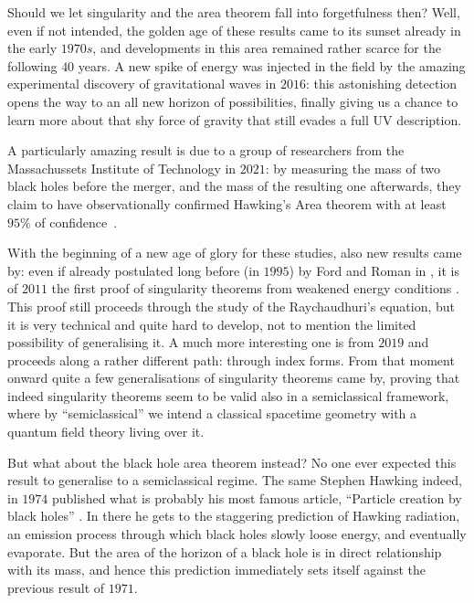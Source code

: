 Should we let singularity and the area theorem fall into forgetfulness then? Well, even if not intended, the golden age of these results came to its sunset already in the early \(1970s\), and developments in this area remained rather scarce for the following \(40\) years. A new spike of energy was injected in the field by the amazing experimental discovery of gravitational waves in \(2016\): this astonishing detection opens the way to an all new horizon of possibilities, finally giving us a chance to learn more about that shy force of gravity that still evades a full UV description.

A particularly amazing result is due to a group of researchers from the Massachussets Institute of Technology in \(2021\): by measuring the mass of two black holes before the merger, and the mass of the resulting one afterwards, they claim to have observationally confirmed Hawking's Area theorem with at least \(95\%\) of confidence~\cite[]{PhysRevLett.127.011103}.

With the beginning of a new age of glory for these studies, also new results came by: even if already postulated long before (in \(1995\)) by Ford and Roman in \cite[]{ford1996averaged}, it is of \(2011\) the first proof of singularity theorems from weakened energy conditions \cite[]{fewster2011singularity}. This proof still proceeds through the study of the Raychaudhuri's equation, but it is very technical and quite hard to develop, not to mention the limited possibility of generalising it. A much more interesting one is from \(2019\) \cite[]{fewster2020new} and proceeds along a rather different path: through index forms.
From that moment onward quite a few generalisations of singularity theorems came by, proving that indeed singularity theorems seem to be valid also in a semiclassical framework, where by ``semiclassical'' we intend a classical spacetime geometry with a quantum field theory living over it.

But what about the black hole area theorem instead? No one ever expected this result to generalise to a semiclassical regime. The same Stephen Hawking indeed, in \(1974\) published what is probably his most famous article, ``Particle creation by black holes'' \cite[]{hawking1975particle}. In there he gets to the staggering prediction of Hawking radiation, an emission process through which black holes slowly loose energy, and eventually evaporate. But the area of the horizon of a black hole is in direct relationship with its mass, and hence this prediction immediately sets itself against the previous result of \(1971\).

